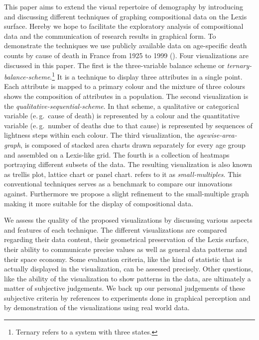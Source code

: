 \documentclass{scrartcl}
\begin{document}
This paper aims to extend the visual repertoire of demography by introducing and discussing different techniques of graphing compositional data on the Lexis surface. Hereby we hope to facilitate the exploratory analysis of compositional data and the communication of research results in graphical form. To demonstrate the techniques we use publicly available data on age-specific death counts by cause of death in France from 1925 to 1999 (\cite{Vallin2014}). Four visualizations are discussed in this paper. The first is the three-variable balance scheme or \emph{ternary-balance-scheme}.\footnote{Ternary refers to a system with three states.} It is a technique to display three attributes in a single point. Each attribute is mapped to a primary colour and the mixture of three colours shows the composition of attributes in a population. The second visualization is the \emph{qualitative-sequential-scheme}. In that scheme, a qualitative or categorical variable (e.\,g.~cause of death) is represented by a colour and the quantitative variable (e.\,g.~number of deaths due to that cause) is represented by sequences of lightness steps within each colour. The third visualization, the \emph{agewise-area-graph}, is composed of stacked area charts drawn separately for every age group and assembled on a Lexis-like grid. The fourth is a collection of heatmaps portraying different subsets of the data. The resulting visualization is also known as trellis plot, lattice chart or panel chart. \textcite{Tufte1990} refers to it as \emph{small-multiples}. This conventional techniques serves as a benchmark to compare our innovations against. Furthermore we propose a slight refinement to the small-multiple graph making it more suitable for the display of compositional data.

We assess the quality of the proposed visualizations by discussing various aspects and features of each technique. The different visualizations are compared regarding their data content, their geometrical preservation of the Lexis surface, their ability to communicate precise values as well as general data patterns and their space economy. Some evaluation criteria, like the kind of statistic that is actually displayed in the visualization, can be assessed precisely. Other questions, like the ability of the visualization to show patterns in the data, are ultimately a matter of subjective judgements. We back up our personal judgements of these subjective criteria by references to experiments done in graphical perception and by demonstration of the visualizations using real world data.
\end{document}

